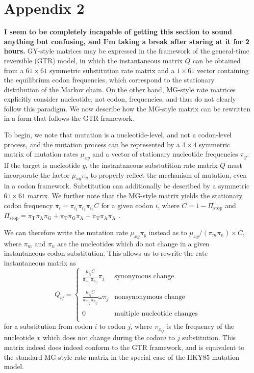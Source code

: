 \documentclass[11pt]{article}
\begin{document}
\section*{Appendix 2}
\textbf{I seem to be completely incapable of getting this section to sound anything but confusing, and I'm taking a break after staring at it for 2 hours.}
GY-style matrices may be expressed in the framework of the general-time reversible (GTR) model, in which the instantaneous matrix $Q$ can be obtained from a $61 \times 61$ symmetric substitution rate matrix and a $1\times61$ vector containing the equilibrium codon frequencies, which correspond to the stationary distribution of the Markov chain. On the other hand, MG-style rate matrices explicitly consider nucleotide, not codon, frequencies, and thus do not clearly follow this paradigm. We now describe how the MG-style matrix can be rewritten in a form that follows the GTR framework. 

To begin, we note that mutation is a nucleotide-level, and not a codon-level process, and the mutation process can be represented by a $4 \times 4$ symmetric matrix of mutation rates $\mu_{xy}$ and a vector of stationary nucleotide frequencies $\pi_y$. If the target is nucleotide $y$, the instantaneous substutition rate matrix $Q$ must incorporate the factor $\mu_{xy}\pi_y$ to properly reflect the mechanism of mutation, even in a codon framework. Substitution can additionally be described by a symmetric $61\times61$ matrix. We further note that the MG-style matrix yields the stationary codon frequency $\pi_i = \pi_{i_1}\pi_{i_2}\pi_{i_3}C$ for a given codon $i$, where $C = 1 - \Pi_\text{stop}$ and $\Pi_\text{stop} = \pi_\text{T}\pi_\text{A}\pi_\text{G} + \pi_\text{T}\pi_\text{G}\pi_\text{A} + \pi_\text{T}\pi_\text{A}\pi_\text{A}$ \cite{MuseGaut1994}. 


We can therefore write the mutation rate $\mu_{xy}\pi_y$ instead as to $\mu_{xy} / (\pi_m\pi_n) \times C$, where $\pi_m$ and $\pi_n$ are the nucleotides which do not change in a given instantaneous codon substitution. This allows us to rewrite the rate instantaneous matrix as 
\begin{equation}
Q_{ij} = \left\{ 
\begin{array}{rl}
\frac{\mu_{ij}C}{\pi_{m_{ij}}\pi_{n_{ij}}}\pi_j               &\mbox{synonymous change} \\\\
\frac{\mu_{ij}C}{\pi_{m_{ij}}\pi_{n_{ij}}}\omega\pi_j         &\mbox{nonsynonymous change} \\\\
0                                                     &\mbox{multiple nucleotide changes} \\           
\end{array} \right.
\end{equation} for a substitution from codon $i$ to codon $j$, where $\pi_{x_{ij}}$ is the frequency of the nucleotide $x$ which does not change during the codon$i$ to $j$ substitution. This matrix indeed does indeed conform to the GTR framework, and is equivalent to the standard MG-style rate matrix \cite{MuseGaut1994} in the special case of the HKY85 mutation model.
		
\end{document}
